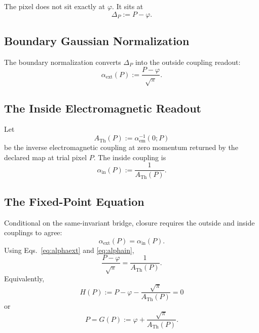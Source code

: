 \documentclass[11pt]{article}
\theoremstyle{remark}
\newcommand{\ATh}{A_{\mathrm{Th}}}
\begin{document}
The pixel does not sit exactly at \(\varphi\). It sits at
\begin{equation}
\Delta_P:=P-\varphi.
\label{eq:deltaP}
\end{equation}


\subsection{Boundary Gaussian Normalization}
\label{sec:alpha-step-4}

The boundary normalization converts \(\Delta_P\) into the outside coupling readout:
\begin{equation}
\alpha_{\mathrm{ext}}(P):=\frac{P-\varphi}{\sqrt\pi}.
\label{eq:alphaext}
\end{equation}


\subsection{The Inside Electromagnetic Readout}
\label{sec:alpha-step-5}

Let
\begin{equation}
\ATh(P):=\alpha_{\mathrm{em}}^{-1}(0;P)
\label{eq:ATdef}
\end{equation}
be the inverse electromagnetic coupling at zero momentum returned by the
declared map at trial pixel \(P\). The inside coupling is
\begin{equation}
\alpha_{\mathrm{in}}(P):=\frac{1}{\ATh(P)}.
\label{eq:alphain}
\end{equation}


\subsection{The Fixed-Point Equation}
\label{sec:alpha-step-6}

Conditional on the same-invariant bridge, closure requires the outside and inside couplings to agree:
\begin{equation}
\alpha_{\mathrm{ext}}(P)=\alpha_{\mathrm{in}}(P).
\label{eq:couplingmatch}
\end{equation}
Using Eqs.~\eqref{eq:alphaext} and \eqref{eq:alphain},
\begin{equation}
\frac{P-\varphi}{\sqrt\pi}
=
\frac{1}{\ATh(P)}.
\end{equation}
Equivalently,
\begin{equation}
\boxed{
H(P):=P-\varphi-\frac{\sqrt\pi}{\ATh(P)}=0
}
\label{eq:H}
\end{equation}
or
\begin{equation}
\boxed{
P=G(P):=\varphi+\frac{\sqrt\pi}{\ATh(P)}.
}
\label{eq:G}
\end{equation}
\end{document}
